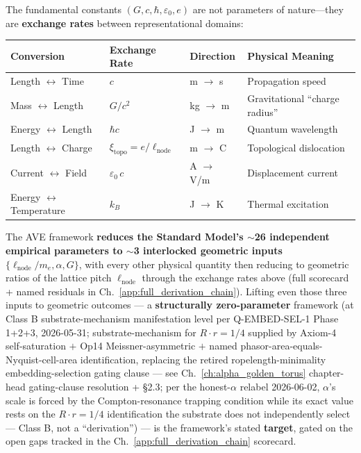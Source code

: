 The fundamental constants $(G, c, \hbar, \varepsilon_0, e)$ are not parameters of nature---they are \textbf{exchange rates} between representational domains:

\begin{center}
\renewcommand{\arraystretch}{1.3}
\begin{tabular}{l l l l}
\toprule
\textbf{Conversion} & \textbf{Exchange Rate} & \textbf{Direction} & \textbf{Physical Meaning} \\
\midrule
Length $\leftrightarrow$ Time & $c$ & m $\to$ s & Propagation speed \\
Mass $\leftrightarrow$ Length & $G/c^2$ & kg $\to$ m & Gravitational ``charge radius'' \\
Energy $\leftrightarrow$ Length & $\hbar c$ & J $\to$ m & Quantum wavelength \\
Length $\leftrightarrow$ Charge & $\xi_\mathrm{topo} = e / \ell_\mathrm{node}$ & m $\to$ C & Topological dislocation \\
Current $\leftrightarrow$ Field & $\varepsilon_0\,c$ & A $\to$ V/m & Displacement current \\
Energy $\leftrightarrow$ Temperature & $k_B$ & J $\to$ K & Thermal excitation \\
\bottomrule
\end{tabular}
\end{center}

\noindent The AVE framework \textbf{reduces the Standard Model's $\sim$26 independent empirical parameters to $\sim$3 interlocked geometric inputs} $\{\ell_\mathrm{node}/m_e, \alpha, G\}$, with every other physical quantity then reducing to geometric ratios of the lattice pitch $\ell_\mathrm{node}$ through the exchange rates above (full scorecard + named residuals in Ch.~\ref{app:full_derivation_chain}). Lifting even those three inputs to geometric outcomes --- a \textbf{structurally zero-parameter} framework (at Class B substrate-mechanism manifestation level per Q-EMBED-SEL-1 Phase 1+2+3, 2026-05-31; substrate-mechanism for $R \cdot r = 1/4$ supplied by Axiom-4 self-saturation $+$ Op14 Meissner-asymmetric $+$ named phasor-area-equals-Nyquist-cell-area identification, replacing the retired ropelength-minimality embedding-selection gating clause --- see Ch.~\ref{ch:alpha_golden_torus} chapter-head gating-clause resolution +  \S2.3; per the honest-$\alpha$ relabel 2026-06-02, $\alpha$'s scale is forced by the Compton-resonance trapping condition while its exact value rests on the $R \cdot r = 1/4$ identification the substrate does not independently select --- Class B, not a ``derivation'') --- is the framework's stated \textbf{target}, gated on the open gaps tracked in the Ch.~\ref{app:full_derivation_chain} scorecard.


